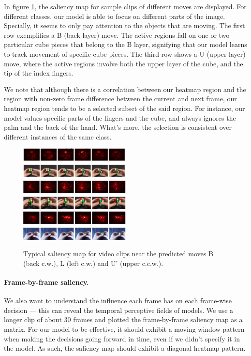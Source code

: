 \documentclass[10pt,twocolumn,letterpaper]{article}
\begin{document}
In figure \ref{fig:saliency}, the saliency map for sample clips of different moves are displayed. For different classes, our model is able to focus on different parts of the image. Specially, it seems to only pay attention to the objects that are moving. The first row exemplifies a B (back layer) move. The active regions fall on one or two particular cube pieces that belong to the B layer, signifying that our model learns to track movement of specific cube pieces. The third row shows a U (upper layer) move, where the active regions involve both the upper layer of the cube, and the tip of the index fingers. 

We note that although there is a correlation between our heatmap region and the region with non-zero frame difference between the current and next frame, our heatmap region tends to be a selected subset of the said region. For instance, our model values specific parts of the fingers and the cube, and always ignores the palm and the back of the hand. What's more, the selection is consistent over different instances of the same class. 

\begin{figure}[]
    \centering
    \includegraphics[width=0.5\textwidth]{B.png}
    \includegraphics[width=0.5\textwidth]{L.png}
    \includegraphics[width=0.5\textwidth]{U'.png}

    \caption{Typical saliency map for video clips near the predicted moves B (back c.w.), L (left c.w.) and U' (upper c.c.w.).}
    \label{fig:saliency}
\end{figure}


\paragraph{Frame-by-frame saliency.} We also want to understand the influence each frame has on each frame-wise decision --- this can reveal the temporal perceptive fields of models. We use a longer clip of about 30 frames and plotted the frame-by-frame saliency map as a matrix. For our model to be effective, it should exhibit a moving window pattern when making the decisions going forward in time, even if we didn't specify it in the model. As such, the saliency map should exhibit a diagonal heatmap pattern.
\end{document}
